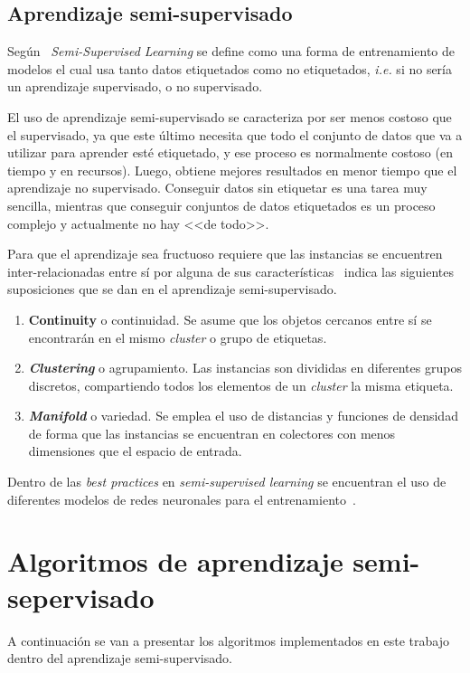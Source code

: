\subsection{Aprendizaje semi-supervisado}\label{subsec:Aprendizaje-Semi-Supervisado}
Según~\cite{zhou2014semi} \textit{Semi-Supervised Learning} se define como una forma de entrenamiento de modelos el cual usa tanto datos etiquetados como no etiquetados, \textit{i.e.} si no sería un aprendizaje supervisado, o no supervisado. 

El uso de aprendizaje semi-supervisado se caracteriza por ser menos costoso que el supervisado, ya que este último necesita que todo el conjunto de datos que va a utilizar para aprender esté etiquetado, y ese proceso es normalmente costoso (en tiempo y en recursos). Luego, obtiene mejores resultados en menor tiempo que el aprendizaje no supervisado. 
Conseguir datos sin etiquetar es una tarea muy sencilla, mientras que conseguir conjuntos de datos etiquetados es un proceso complejo y actualmente no hay <<de todo>>.

Para que el aprendizaje sea fructuoso requiere que las instancias se encuentren inter-relacionadas entre sí por alguna de sus características~\cite{javatpoint_semisupervised} indica las siguientes suposiciones que se dan en el aprendizaje semi-supervisado.
\begin{enumerate}
	\item \textbf{Continuity} o continuidad. Se asume que los objetos cercanos entre sí se encontrarán en el mismo \textit{cluster} o grupo de etiquetas. 
	\item \textbf{\textit{Clustering}} o agrupamiento. Las instancias son divididas en diferentes grupos discretos, compartiendo todos los elementos de un \textit{cluster} la misma etiqueta.
	\item \textbf{\textit{Manifold}} o variedad. Se emplea el uso de distancias y funciones de densidad de forma que las instancias se encuentran en colectores con menos dimensiones que el espacio de entrada.
\end{enumerate}

Dentro de las \textit{best practices} en \textit{semi-supervised learning} se encuentran el uso de diferentes modelos de redes neuronales para el entrenamiento~\cite{thekumparampil2018attention}.


\section{Algoritmos de aprendizaje semi-sepervisado}\label{sec_alg:semi-supervised}
A continuación se van a presentar los algoritmos implementados en este trabajo dentro del aprendizaje semi-supervisado.

